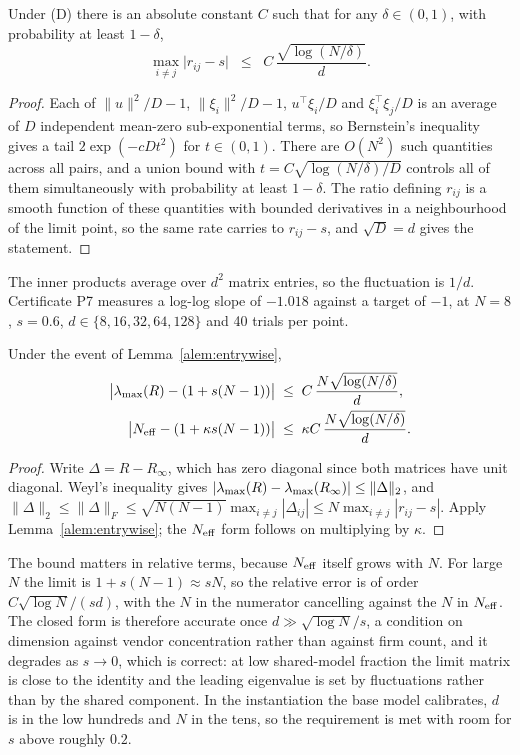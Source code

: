 \begin{alemma}
\label{alem:entrywise}
Under (D) there is an absolute constant $C$ such that for any $\delta \in (0,1)$, with probability at least $1-\delta$,
\[
  \max_{i \neq j} \big| r_{ij} - s \big| \;\;\leq\;\; C\,\frac{\sqrt{\log(N/\delta)}}{d}.
\]
\end{alemma}

\begin{proof}
Each of $\|u\|^2/D - 1$, $\|\xi_i\|^2/D - 1$, $u^{\top}\xi_i/D$ and $\xi_i^{\top}\xi_j/D$ is an average of $D$ independent mean-zero sub-exponential terms, so Bernstein's inequality gives a tail $2\exp(-cDt^2)$ for $t \in (0,1)$. There are $O(N^2)$ such quantities across all pairs, and a union bound with $t = C\sqrt{\log(N/\delta)/D}$ controls all of them simultaneously with probability at least $1-\delta$. The ratio defining $r_{ij}$ is a smooth function of these quantities with bounded derivatives in a neighbourhood of the limit point, so the same rate carries to $r_{ij}-s$, and $\sqrt{D}=d$ gives the statement.
\end{proof}

The inner products average over $d^2$ matrix entries, so the fluctuation is $1/d$. Certificate P7 measures a log-log slope of $-1.018$ against a target of $-1$, at $N=8$, $s=0.6$, $d \in \{8,16,32,64,128\}$ and 40 trials per point.

\begin{aproposition}
\label{aprop:weyl}
Under the event of Lemma~\ref{alem:entrywise},
\begin{align*}
  \big|\lambda_{\max}(R) - (1+s(N-1))\big| &\;\leq\; C\,\frac{N\sqrt{\log(N/\delta)}}{d}, \\
  \big|N_{\mathrm{eff}} - (1+\kappa s(N-1))\big| &\;\leq\; \kappa C\,\frac{N\sqrt{\log(N/\delta)}}{d}.
\end{align*}
\end{aproposition}

\begin{proof}
Write $\Delta = R - R_\infty$, which has zero diagonal since both matrices have unit diagonal. Weyl's inequality gives $|\lambda_{\max}(R)-\lambda_{\max}(R_\infty)| \leq \|\Delta\|_2$, and $\|\Delta\|_2 \leq \|\Delta\|_F \leq \sqrt{N(N-1)}\max_{i\neq j}|\Delta_{ij}| \leq N\max_{i \neq j}|r_{ij}-s|$. Apply Lemma~\ref{alem:entrywise}; the $N_{\mathrm{eff}}$ form follows on multiplying by $\kappa$.
\end{proof}

The bound matters in relative terms, because $N_{\mathrm{eff}}$ itself grows with $N$. For large $N$ the limit is $1+s(N-1) \approx sN$, so the relative error is of order $C\sqrt{\log N}/(sd)$, with the $N$ in the numerator cancelling against the $N$ in $N_{\mathrm{eff}}$. The closed form is therefore accurate once $d \gg \sqrt{\log N}/s$, a condition on dimension against vendor concentration rather than against firm count, and it degrades as $s \to 0$, which is correct: at low shared-model fraction the limit matrix is close to the identity and the leading eigenvalue is set by fluctuations rather than by the shared component. In the instantiation the base model calibrates, $d$ is in the low hundreds and $N$ in the tens, so the requirement is met with room for $s$ above roughly $0.2$.

